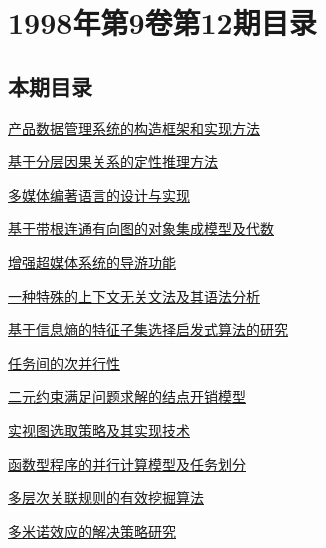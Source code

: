 \documentclass[a4paper]{article}
\begin{document}
\section{\textbf{1998年第9卷第12期目录}}
\subsection{本期目录}
\href{http://www.jos.org.cn/ch/reader/download_pdf.aspx?file_no=19981201&year_id=1998&quarter_id=12&falg=1}{产品数据管理系统的构造框架和实现方法}

\href{http://www.jos.org.cn/ch/reader/download_pdf.aspx?file_no=19981202&year_id=1998&quarter_id=12&falg=1}{基于分层因果关系的定性推理方法}

\href{http://www.jos.org.cn/ch/reader/download_pdf.aspx?file_no=19981203&year_id=1998&quarter_id=12&falg=1}{多媒体编著语言的设计与实现}

\href{http://www.jos.org.cn/ch/reader/download_pdf.aspx?file_no=19981204&year_id=1998&quarter_id=12&falg=1}{基于带根连通有向图的对象集成模型及代数}

\href{http://www.jos.org.cn/ch/reader/download_pdf.aspx?file_no=19981205&year_id=1998&quarter_id=12&falg=1}{增强超媒体系统的导游功能}

\href{http://www.jos.org.cn/ch/reader/download_pdf.aspx?file_no=19981206&year_id=1998&quarter_id=12&falg=1}{一种特殊的上下文无关文法及其语法分析}

\href{http://www.jos.org.cn/ch/reader/download_pdf.aspx?file_no=19981207&year_id=1998&quarter_id=12&falg=1}{基于信息熵的特征子集选择启发式算法的研究}

\href{http://www.jos.org.cn/ch/reader/download_pdf.aspx?file_no=19981208&year_id=1998&quarter_id=12&falg=1}{任务间的次并行性}

\href{http://www.jos.org.cn/ch/reader/download_pdf.aspx?file_no=19981209&year_id=1998&quarter_id=12&falg=1}{二元约束满足问题求解的结点开销模型}

\href{http://www.jos.org.cn/ch/reader/download_pdf.aspx?file_no=19981210&year_id=1998&quarter_id=12&falg=1}{实视图选取策略及其实现技术}

\href{http://www.jos.org.cn/ch/reader/download_pdf.aspx?file_no=19981211&year_id=1998&quarter_id=12&falg=1}{函数型程序的并行计算模型及任务划分}

\href{http://www.jos.org.cn/ch/reader/download_pdf.aspx?file_no=19981212&year_id=1998&quarter_id=12&falg=1}{多层次关联规则的有效挖掘算法}

\href{http://www.jos.org.cn/ch/reader/download_pdf.aspx?file_no=19981213&year_id=1998&quarter_id=12&falg=1}{多米诺效应的解决策略研究}
\end{document}
